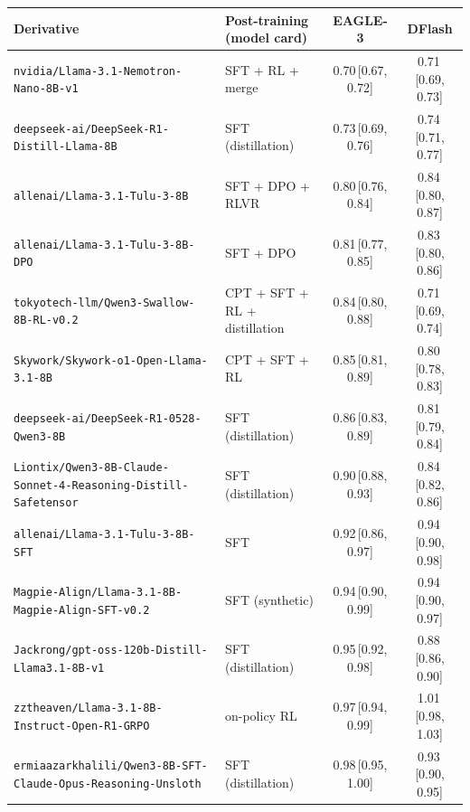 \documentclass[11pt]{article}
\begin{document}
\begin{table}[t]
  \centering
  \scriptsize
  \setlength{\tabcolsep}{4pt}
  \begin{tabular}{@{}llcc@{}}
    \toprule
    Derivative & Post-training (model card) & EAGLE-3 & DFlash \\
    \midrule
    \texttt{nvidia/Llama-3.1-Nemotron-Nano-8B-v1} & SFT + RL + merge & 0.70\,{\scriptsize[0.67, 0.72]} & 0.71\,{\scriptsize[0.69, 0.73]} \\
    \texttt{deepseek-ai/DeepSeek-R1-Distill-Llama-8B} & SFT (distillation) & 0.73\,{\scriptsize[0.69, 0.76]} & 0.74\,{\scriptsize[0.71, 0.77]} \\
    \texttt{allenai/Llama-3.1-Tulu-3-8B} & SFT + DPO + RLVR & 0.80\,{\scriptsize[0.76, 0.84]} & 0.84\,{\scriptsize[0.80, 0.87]} \\
    \texttt{allenai/Llama-3.1-Tulu-3-8B-DPO} & SFT + DPO & 0.81\,{\scriptsize[0.77, 0.85]} & 0.83\,{\scriptsize[0.80, 0.86]} \\
    \texttt{tokyotech-llm/Qwen3-Swallow-8B-RL-v0.2} & CPT + SFT + RL + distillation & 0.84\,{\scriptsize[0.80, 0.88]} & 0.71\,{\scriptsize[0.69, 0.74]} \\
    \texttt{Skywork/Skywork-o1-Open-Llama-3.1-8B} & CPT + SFT + RL & 0.85\,{\scriptsize[0.81, 0.89]} & 0.80\,{\scriptsize[0.78, 0.83]} \\
    \texttt{deepseek-ai/DeepSeek-R1-0528-Qwen3-8B} & SFT (distillation) & 0.86\,{\scriptsize[0.83, 0.89]} & 0.81\,{\scriptsize[0.79, 0.84]} \\
    \texttt{Liontix/Qwen3-8B-Claude-Sonnet-4-Reasoning-Distill-Safetensor} & SFT (distillation) & 0.90\,{\scriptsize[0.88, 0.93]} & 0.84\,{\scriptsize[0.82, 0.86]} \\
    \texttt{allenai/Llama-3.1-Tulu-3-8B-SFT} & SFT & 0.92\,{\scriptsize[0.86, 0.97]} & 0.94\,{\scriptsize[0.90, 0.98]} \\
    \texttt{Magpie-Align/Llama-3.1-8B-Magpie-Align-SFT-v0.2} & SFT (synthetic) & 0.94\,{\scriptsize[0.90, 0.99]} & 0.94\,{\scriptsize[0.90, 0.97]} \\
    \texttt{Jackrong/gpt-oss-120b-Distill-Llama3.1-8B-v1} & SFT (distillation) & 0.95\,{\scriptsize[0.92, 0.98]} & 0.88\,{\scriptsize[0.86, 0.90]} \\
    \texttt{zztheaven/Llama-3.1-8B-Instruct-Open-R1-GRPO} & on-policy RL & 0.97\,{\scriptsize[0.94, 0.99]} & 1.01\,{\scriptsize[0.98, 1.03]} \\
    \texttt{ermiaazarkhalili/Qwen3-8B-SFT-Claude-Opus-Reasoning-Unsloth} & SFT (distillation) & 0.98\,{\scriptsize[0.95, 1.00]} & 0.93\,{\scriptsize[0.90, 0.95]} \\

\end{tabular}
\end{table}
\end{document}
